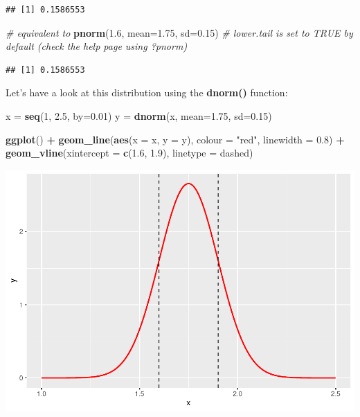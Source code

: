 \documentclass[
]{book}
\newenvironment{Shaded}{\begin{snugshade}}{\end{snugshade}}
\newcommand{\AttributeTok}[1]{\textcolor[rgb]{0.13,0.29,0.53}{#1}}
\newcommand{\CommentTok}[1]{\textcolor[rgb]{0.56,0.35,0.01}{\textit{#1}}}
\newcommand{\DecValTok}[1]{\textcolor[rgb]{0.00,0.00,0.81}{#1}}
\newcommand{\FloatTok}[1]{\textcolor[rgb]{0.00,0.00,0.81}{#1}}
\newcommand{\FunctionTok}[1]{\textcolor[rgb]{0.13,0.29,0.53}{\textbf{#1}}}
\newcommand{\NormalTok}[1]{#1}
\newcommand{\OtherTok}[1]{\textcolor[rgb]{0.56,0.35,0.01}{#1}}
\newcommand{\SpecialCharTok}[1]{\textcolor[rgb]{0.81,0.36,0.00}{\textbf{#1}}}
\newcommand{\StringTok}[1]{\textcolor[rgb]{0.31,0.60,0.02}{#1}}
\begin{document}
\begin{verbatim}
## [1] 0.1586553
\end{verbatim}

\begin{Shaded}
\begin{Highlighting}[]
\CommentTok{\# equivalent to }
\FunctionTok{pnorm}\NormalTok{(}\FloatTok{1.6}\NormalTok{, }\AttributeTok{mean=}\FloatTok{1.75}\NormalTok{, }\AttributeTok{sd=}\FloatTok{0.15}\NormalTok{) }\CommentTok{\# lower.tail is set to TRUE by default (check the help page using \textasciigrave{}?pnorm\textasciigrave{})}
\end{Highlighting}
\end{Shaded}

\begin{verbatim}
## [1] 0.1586553
\end{verbatim}

Let's have a look at this distribution using the \textbf{dnorm()} function:

\begin{Shaded}
\begin{Highlighting}[]
\NormalTok{x }\OtherTok{=} \FunctionTok{seq}\NormalTok{(}\DecValTok{1}\NormalTok{, }\FloatTok{2.5}\NormalTok{, }\AttributeTok{by=}\FloatTok{0.01}\NormalTok{)}
\NormalTok{y }\OtherTok{=} \FunctionTok{dnorm}\NormalTok{(x, }\AttributeTok{mean=}\FloatTok{1.75}\NormalTok{, }\AttributeTok{sd=}\FloatTok{0.15}\NormalTok{)}

\FunctionTok{ggplot}\NormalTok{() }\SpecialCharTok{+}
  \FunctionTok{geom\_line}\NormalTok{(}\FunctionTok{aes}\NormalTok{(}\AttributeTok{x =}\NormalTok{ x, }\AttributeTok{y =}\NormalTok{ y),}
            \AttributeTok{colour =} \StringTok{"red"}\NormalTok{, }\AttributeTok{linewidth =} \FloatTok{0.8}\NormalTok{) }\SpecialCharTok{+}
  \FunctionTok{geom\_vline}\NormalTok{(}\AttributeTok{xintercept =} \FunctionTok{c}\NormalTok{(}\FloatTok{1.6}\NormalTok{, }\FloatTok{1.9}\NormalTok{),}
             \AttributeTok{linetype =} \StringTok{\textquotesingle{}dashed\textquotesingle{}}\NormalTok{)}
\end{Highlighting}
\end{Shaded}

\includegraphics{_main_files/figure-latex/unnamed-chunk-92-1.pdf}
\end{document}
